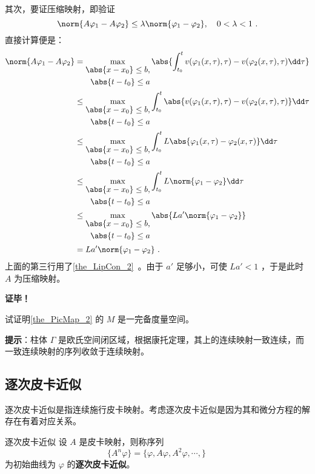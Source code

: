 其次，要证压缩映射，即验证 
\begin{equation}
\norm{A\varphi_1-A\varphi_2}\leq\lambda\norm{\varphi_1-\varphi_2},\quad 0<\lambda<1~.
\end{equation}
直接计算便是：
\begin{equation}
\begin{aligned}
\norm{A\varphi_1-A\varphi_2}&=\max_{\begin{aligned}\abs{x-x_0}\leq b,\\\abs{t-t_0}\leq a\end{aligned}}\abs{\int_{t_0}^t v(\varphi_1(x,\tau),\tau)-v(\varphi_2(x,\tau),\tau)\dd \tau}\\
&\leq\max_{\begin{aligned}\abs{x-x_0}\leq b,\\\abs{t-t_0}\leq a\end{aligned}}\int_{t_0}^t \abs{v(\varphi_1(x,\tau),\tau)-v(\varphi_2(x,\tau),\tau)}\dd \tau\\
&\leq \max_{\begin{aligned}\abs{x-x_0}\leq b,\\\abs{t-t_0}\leq a\end{aligned}}\int_{t_0}^t L\abs{\varphi_1(x,\tau)-\varphi_2(x,\tau)}\dd \tau\\
&\leq \max_{\begin{aligned}\abs{x-x_0}\leq b,\\\abs{t-t_0}\leq a\end{aligned}}\int_{t_0}^t L\norm{\varphi_1-\varphi_2}\dd \tau\\
&\leq\max_{\begin{aligned}\abs{x-x_0}\leq b,\\\abs{t-t_0}\leq a\end{aligned}}\abs{ La'\norm{\varphi_1-\varphi_2}}\\
&= La'\norm{\varphi_1-\varphi_2}~.
\end{aligned}
\end{equation}
上面的第三行用了\autoref{the_LipCon_2}~。由于 $a'$ 足够小，可使 $La'<1$ ，于是此时 $A$ 为压缩映射。

\textbf{证毕！}
\begin{exercise}{}\label{exe_PicMap_1}{}
试证明\autoref{the_PicMap_2} 的 $M$ 是一完备度量空间。
\end{exercise}
\textbf{提示}：柱体 $\Gamma$ 是欧氏空间闭区域，根据康托定理，其上的连续映射一致连续，而一致连续映射的序列收敛于连续映射。
\subsection{逐次皮卡近似}
逐次皮卡近似是指连续施行皮卡映射。考虑逐次皮卡近似是因为其和微分方程的解存在有着对应关系。
\begin{definition}{逐次皮卡近似}
设 $A$ 是皮卡映射，则称序列
\begin{equation}
\{A^n\varphi\}=\{\varphi, A\varphi, A^2\varphi,\cdots,\}~ 
\end{equation}
为初始曲线为 $\varphi$ 的\textbf{逐次皮卡近似}。
\end{definition}

